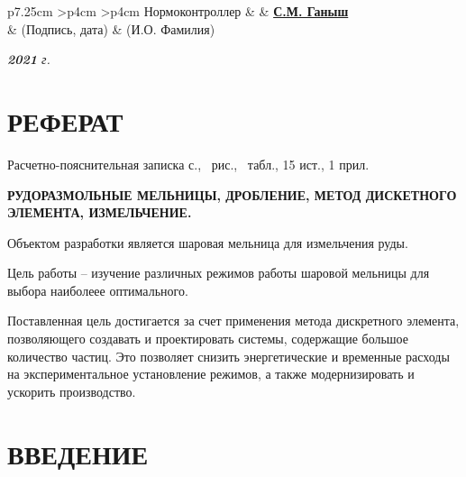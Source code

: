 \documentclass[utf8x, 14pt, oneside, a4paper]{article}
\newenvironment{signstabular}[1][1]{
	\renewcommand*{\arraystretch}{#1}
	\tabular
}{
	\endtabular
}
\begin{document}
\begin{titlepage}
\begin{table}[h!]
			\vspace{\baselineskip}

			\begin{signstabular}[0.7]{p{7.25cm} >{\centering\arraybackslash}p{4cm} >{\centering\arraybackslash}p{4cm}}
				Нормоконтроллер & \uline{\hspace*{4cm}} & \uline{\hfill \textbf{С.М. Ганыш} \hfill} \\
				& \scriptsize (Подпись, дата) & \scriptsize (И.О. Фамилия)
			\end{signstabular}
		\end{table}

		\vfill

		\begin{center}
			\normalsize \textit{\textbf{2021} г.}
		\end{center}
	\end{titlepage}
\pagebreak
	\normalsize
	\setcounter{page}{2}
	
		\section*{РЕФЕРАТ}
		\normalsize
			Расчетно-пояснительная записка \pageref{LastPage} с., \totalfigures\ рис., \totaltables\ табл., 15 ист., 1 прил.

			\textbf{РУДОРАЗМОЛЬНЫЕ МЕЛЬНИЦЫ, ДРОБЛЕНИЕ, МЕТОД ДИСКЕТНОГО ЭЛЕМЕНТА, ИЗМЕЛЬЧЕНИЕ.}

Объектом разработки является шаровая мельница для измельчения руды.

Цель работы -- изучение различных режимов работы шаровой мельницы для выбора наиболеее оптимального. 

Поставленная цель достигается за счет применения метода дискретного элемента, позволяющего создавать и проектировать системы, содержащие большое количество частиц.
Это позволяет снизить энергетические и временные расходы на экспериментальное установление режимов, а также модернизировать и ускорить производство.


		\pagebreak
	
	\renewcommand{\contentsname}{\normalsize\bfseries\centering СОДЕРЖАНИЕ}
	\small
	\tableofcontents
	\normalsize

		\pagebreak

	\section*{ВВЕДЕНИЕ}
\end{document}
